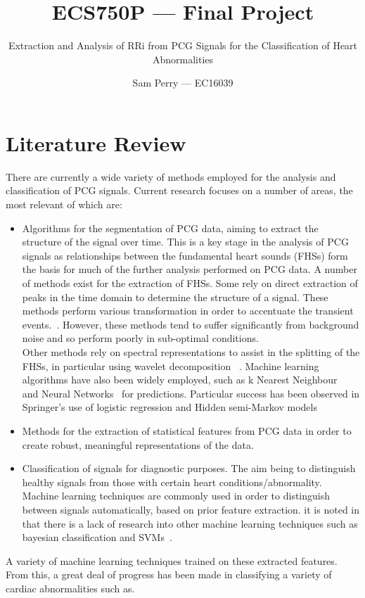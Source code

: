 \documentclass[titlepage]{scrartcl}
\begin{document}
\title{ECS750P --- Final Project}
\subtitle{\LARGE{Extraction and Analysis of RRi from PCG Signals for the
Classification of Heart Abnormalities}}
\author{Sam Perry --- EC16039}

\maketitle

\section{Literature Review}
There are currently a wide variety of methods employed for the analysis and
classification of PCG signals. Current research focuses on a number of areas,
the most relevant of which are:
\begin{itemize}
    \item Algorithms for the segmentation of PCG data, aiming to extract the
        structure of the signal over time. This is a key stage in the analysis
        of PCG signals as relationships between the fundamental heart sounds
        (FHSs) form the basis for much of the further analysis performed on PCG
        data. A number of methods exist for the extraction of FHSs. Some rely on direct extraction of
        peaks in the time domain to determine the structure of a
        signal. These methods perform various transformation in order to
        accentuate the transient events.~\parencite{Groch1992, Liang1997}. However, these methods
        tend to suffer significantly from background noise and so perform
        poorly in sub-optimal conditions.\\
        Other methods rely on spectral representations to
        assist in the splitting of the FHSs, in particular using wavelet
        decomposition  ~\parencite{}. Machine learning
        algorithms have also been widely employed, such as k Nearest
        Neighbour~\parencite{} and Neural Networks~\parencite{} for
        predictions. Particular success has been observed in Springer's use of
        logistic regression and Hidden semi-Markov models~\citeyearpar{Springer2016}
    \item Methods for the extraction of statistical features from PCG data in
        order to create robust, meaningful representations of the data.
    \item Classification of signals for diagnostic purposes. The aim being to
        distinguish healthy signals from those with certain heart
        conditions/abnormality. Machine learning techniques are commonly used
        in order to distinguish between signals automatically, based on prior
        feature extraction. 
        it is noted in  that there is a lack of research into other machine
        learning techniques such as bayesian classification and
        SVMs~\citeyearpar{}.
\end{itemize}



        
A variety of machine learning techniques trained on these extracted
features. From this, a great deal of progress has been made in classifying a
variety of cardiac abnormalities such as. 

\printbibliography{}
\end{document}
